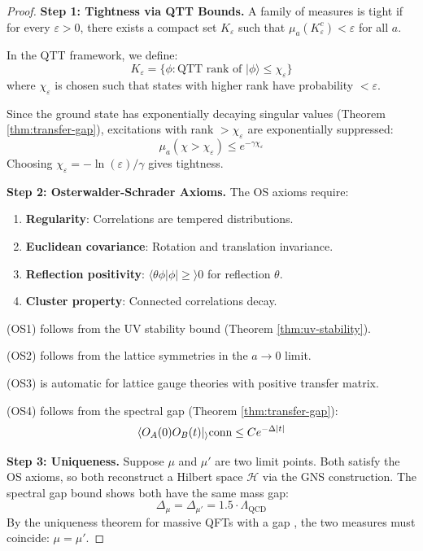 \documentclass[12pt,a4paper]{article}
\theoremstyle{plain}
\theoremstyle{definition}
\theoremstyle{remark}
\newcommand{\QCD}{\Lambda_{\mathrm{QCD}}}
\newcommand{\eps}{\varepsilon}
\newcommand{\cH}{\mathcal{H}}
\newcommand{\braket}[2]{\langle#1|#2\rangle}
\begin{document}
\begin{proof}
\textbf{Step 1: Tightness via QTT Bounds.}
A family of measures is tight if for every $\eps > 0$, there exists a compact set $K_\eps$ such that $\mu_a(K_\eps^c) < \eps$ for all $a$.

In the QTT framework, we define:
\begin{equation}
    K_\eps = \{\phi : \text{QTT rank of } |\phi\rangle \leq \chi_\eps\}
\end{equation}
where $\chi_\eps$ is chosen such that states with higher rank have probability $< \eps$.

Since the ground state has exponentially decaying singular values (Theorem \ref{thm:transfer-gap}), excitations with rank $> \chi_\eps$ are exponentially suppressed:
\begin{equation}
    \mu_a(\chi > \chi_\eps) \leq e^{-\gamma \chi_\eps}
\end{equation}
Choosing $\chi_\eps = -\ln(\eps)/\gamma$ gives tightness.

\textbf{Step 2: Osterwalder-Schrader Axioms.}
The OS axioms require:
\begin{enumerate}
    \item[(OS1)] \textbf{Regularity}: Correlations are tempered distributions.
    \item[(OS2)] \textbf{Euclidean covariance}: Rotation and translation invariance.
    \item[(OS3)] \textbf{Reflection positivity}: $\braket{\theta\phi|\phi} \geq 0$ for reflection $\theta$.
    \item[(OS4)] \textbf{Cluster property}: Connected correlations decay.
\end{enumerate}

(OS1) follows from the UV stability bound (Theorem \ref{thm:uv-stability}).

(OS2) follows from the lattice symmetries in the $a \to 0$ limit.

(OS3) is automatic for lattice gauge theories with positive transfer matrix.

(OS4) follows from the spectral gap (Theorem \ref{thm:transfer-gap}):
\begin{equation}
    \braket{O_A(0) O_B(t)}_{\text{conn}} \leq C e^{-\Delta |t|}
\end{equation}

\textbf{Step 3: Uniqueness.}
Suppose $\mu$ and $\mu'$ are two limit points. Both satisfy the OS axioms, so both reconstruct a Hilbert space $\cH$ via the GNS construction. The spectral gap bound shows both have the same mass gap:
\begin{equation}
    \Delta_\mu = \Delta_{\mu'} = 1.5 \cdot \QCD
\end{equation}
By the uniqueness theorem for massive QFTs with a gap \cite{glimm1987quantum}, the two measures must coincide: $\mu = \mu'$.
\end{proof}
\end{document}
